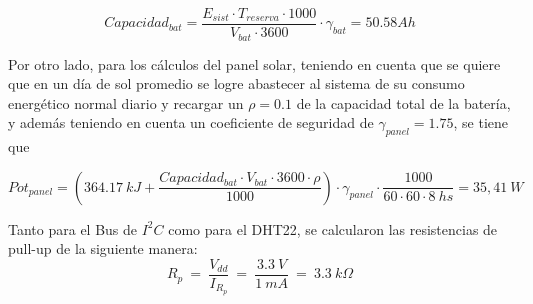 \begin{equation}
Capacidad_{bat} = \frac{E_{sist}\cdot T_{reserva}\cdot 1000}{V_{bat}\cdot 3600}\cdot \gamma_{bat} = 50.58Ah
\end{equation}

Por otro lado, para los cálculos del panel solar, teniendo en cuenta que se quiere que en un día de sol promedio se logre abastecer al sistema de su consumo energético normal diario y recargar un $\rho = 0.1$ de la capacidad total de la batería, y además teniendo en cuenta un coeficiente de seguridad de $\gamma_{panel} = 1.75$, se tiene que

\begin{equation}
Pot_{panel} = \left( 364.17 \ kJ + \frac{Capacidad_{bat}\cdot V_{bat}\cdot 3600\cdot \rho}{1000}\right)\cdot \gamma_{panel} \cdot  \frac{1000}{60\cdot 60\cdot 8 \ hs} = 35,41 \ W
\end{equation}


Tanto para el Bus de $I^2C$ como para el DHT22, se calcularon las resistencias de pull-up de la siguiente manera:
\begin{equation}
	R_p \ = \  \frac{V_{dd}}{I_{R_p}} \ = \ \frac{3.3 \ V}{1 \ mA} \ = \ 3.3 \ k\Omega  
\end{equation}

